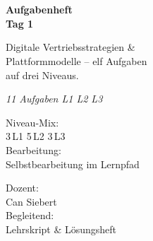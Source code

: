 \documentclass[11pt,a4paper,oneside]{article}
\newcommand{\caveatfontfallback}{\itshape}
\newcommand\caveatfont{\caveatfontfallback}%
\begin{document}
\begin{titlepage}
  \pagestyle{empty}
  \vspace*{1.5cm}
  \\[2pt]
  \noindent{\color{lpAccent}\rule{\linewidth}{1.2pt}}\\[4pt]

  \vspace{3cm}
  {\sffamily\fontsize{30}{34}\selectfont\bfseries\color{lpInk}Aufgabenheft\\Tag 1\par}

  \vspace{0.7cm}
  {\sffamily\large\color{lpGray}Digitale Vertriebsstrategien \&\\Plattformmodelle -- elf Aufgaben\\auf drei Niveaus.\par}

  \vspace{1.5cm}
  {\caveatfont\LARGE\color{lpAmber}11 Aufgaben \textperiodcentered{} L1 \textperiodcentered{} L2 \textperiodcentered{} L3}\par

  \vfill

  \noindent\begin{minipage}{0.55\linewidth}
    {\sffamily\footnotesize\color{lpGray}Niveau-Mix:}\\
    {\sffamily\small\color{lpInk}3\,\textsf{L1} \textperiodcentered{} 5\,\textsf{L2} \textperiodcentered{} 3\,\textsf{L3}}\\[10pt]
    {\sffamily\footnotesize\color{lpGray}Bearbeitung:}\\
    {\sffamily\small\color{lpInk}Selbstbearbeitung im Lernpfad}
  \end{minipage}\hfill
  \begin{minipage}{0.4\linewidth}
    \raggedleft
    {\sffamily\footnotesize\color{lpGray}Dozent:}\\
    {\sffamily\small\color{lpInk}Can Siebert}\\[10pt]
    {\sffamily\footnotesize\color{lpGray}Begleitend:}\\
    {\sffamily\small\color{lpInk}Lehrskript \& Lösungsheft}
  \end{minipage}

  \vspace{0.5cm}
  \noindent{\color{lpAccent}\rule{\linewidth}{0.6pt}}
\end{titlepage}
\end{document}
